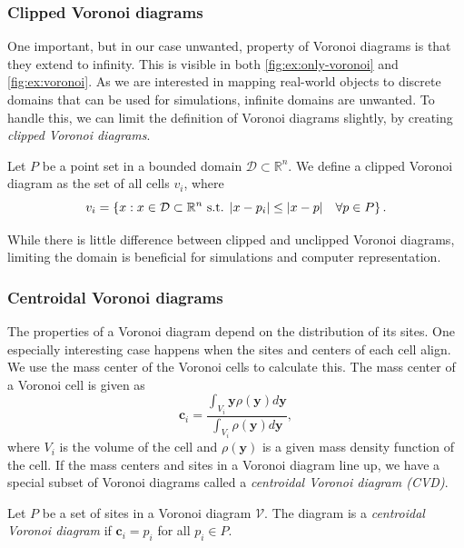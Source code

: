 \subsubsection{Clipped Voronoi diagrams}
One important, but in our case unwanted, property of Voronoi diagrams is that they extend to infinity. This is visible in both \autoref{fig:ex:only-voronoi} and \autoref{fig:ex:voronoi}. As we are interested in mapping real-world objects to discrete domains that can be used for simulations, infinite domains are unwanted. To handle this, we can limit the definition of Voronoi diagrams slightly, by creating \emph{clipped Voronoi diagrams}.

\begin{definition}
Let $P$ be a point set in a bounded domain $\mathcal{D} \subset \mathbb{R}^n$. We define a clipped Voronoi diagram as the set of all cells $v_i$, where
\begin{equation}
\label{eq:clipped-voronoi}
    v_i = \left\{ x : x \in \mathcal{D}\subset \mathbb{R}^n \text{ s.t. } \lvert x - p_i\rvert \leq \lvert x - p\rvert\quad \forall p \in P \right\}.
\end{equation}
\end{definition}

While there is little difference between clipped and unclipped Voronoi diagrams, limiting the domain is beneficial for simulations and computer representation.

\subsubsection{Centroidal Voronoi diagrams}
\label{sec:CVD}
The properties of a Voronoi diagram depend on the distribution of its sites. One especially interesting case happens when the sites and centers of each cell align. We use the mass center of the Voronoi cells to calculate this. The mass center of a Voronoi cell is given as
\begin{equation}
    \mathbf{c}_i = \frac
        {\int_{V_i} \mathbf{y} \rho(\mathbf{y}) d\mathbf{y}}
        {\int_{V_i} \rho(\mathbf{y}) d\mathbf{y}},
\end{equation}
where $V_i$ is the volume of the cell and $\rho(\mathbf{y})$ is a given mass density function of the cell. If the mass centers and sites in a Voronoi diagram line up, we have a special subset of Voronoi diagrams called a \emph{centroidal Voronoi diagram (CVD)}.

\begin{definition}
Let $P$ be a set of sites in a Voronoi diagram $\mathcal{V}$. The diagram is a \emph{centroidal Voronoi diagram} if $\mathbf{c}_i = p_i$ for all $p_i \in P$.
\end{definition}

